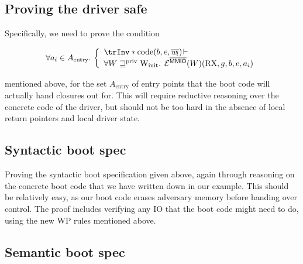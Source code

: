 \documentclass{article}
\newcommand{\X}[1]{\ensuremath{\mathrm{#1}}}
\newcommand{\V}[1]{\ensuremath{\mathit{#1}}}
\DeclareMathOperator{\driverC}{code}
\begin{document}
\subsection{Proving the driver safe}
Specifically, we need to prove the condition

\[
\forall a_{i} \in A_{\X{entry}} \ldotp\,\left\{
    {\begin{array}{ll}
    \trInv \ast
    \driverC(b,e,\overline{\V{w}_l})\!
         \vdash \\
         \forall W \Wpriv \Winit \ldotp\;\ER^{\notMMIO} (W) (\X{RX}, g, b, e, a_i)
        \end{array}} \right.
\]

mentioned above, for the set $A_{\X{entry}}$ of entry points that the boot code
will actually hand closures out for. This will require reductive reasoning over the concrete code of
the driver, but should not be too hard in the absence of local return pointers
and local driver state.

\subsection{Syntactic boot spec}

Proving the syntactic boot specification given above, again through reasoning on
the concrete boot code that we have written down in our example. This should be
relatively easy, as our boot code erases adversary memory before handing over
control. The proof includes verifying any IO that the boot code might need to
do, using the new WP rules mentioned above.

\subsection{Semantic boot spec}
\end{document}
